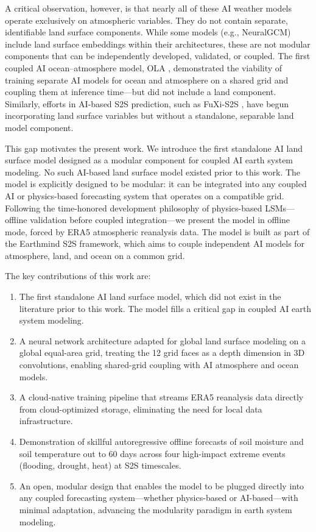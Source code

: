 \documentclass[11pt]{article}
\begin{document}
A critical observation, however, is that nearly all of these AI weather models operate exclusively on atmospheric variables. They do not contain separate, identifiable land surface components. While some models (e.g., NeuralGCM) include land surface embeddings within their architectures, these are not modular components that can be independently developed, validated, or coupled. The first coupled AI ocean--atmosphere model, OLA \citep{caillon2024ola}, demonstrated the viability of training separate AI models for ocean and atmosphere on a shared grid and coupling them at inference time---but did not include a land component. Similarly, efforts in AI-based S2S prediction, such as FuXi-S2S \citep{chen2024fuxis2s}, have begun incorporating land surface variables but without a standalone, separable land model component.

This gap motivates the present work. We introduce the first standalone AI land surface model designed as a modular component for coupled AI earth system modeling. No such AI-based land surface model existed prior to this work. The model is explicitly designed to be modular: it can be integrated into any coupled AI or physics-based forecasting system that operates on a compatible grid. Following the time-honored development philosophy of physics-based LSMs---offline validation before coupled integration---we present the model in offline mode, forced by ERA5 atmospheric reanalysis data. The model is built as part of the Earthmind S2S framework, which aims to couple independent AI models for atmosphere, land, and ocean on a common grid.

The key contributions of this work are:
\begin{enumerate}
    \item The first standalone AI land surface model, which did not exist in the literature prior to this work. The model fills a critical gap in coupled AI earth system modeling.
    \item A neural network architecture adapted for global land surface modeling on a global equal-area grid, treating the 12 grid faces as a depth dimension in 3D convolutions, enabling shared-grid coupling with AI atmosphere and ocean models.
    \item A cloud-native training pipeline that streams ERA5 reanalysis data directly from cloud-optimized storage, eliminating the need for local data infrastructure.
    \item Demonstration of skillful autoregressive offline forecasts of soil moisture and soil temperature out to 60 days across four high-impact extreme events (flooding, drought, heat) at S2S timescales.
    \item An open, modular design that enables the model to be plugged directly into any coupled forecasting system---whether physics-based or AI-based---with minimal adaptation, advancing the modularity paradigm in earth system modeling.
\end{enumerate}
\end{document}
